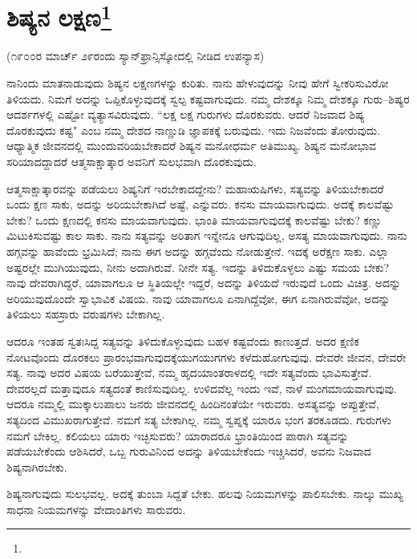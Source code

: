 
\chapter[ಶಿಷ್ಯನ ಲಕ್ಷಣ]{ಶಿಷ್ಯನ ಲಕ್ಷಣ\protect\footnote{}}

\begin{center}
(೧೯೦೦ರ ಮಾರ್ಚ್ ೨೯ರಂದು ಸ್ಯಾನ್‌ಫ್ರಾನ್ಸಿಸ್ಕೋದಲ್ಲಿ ನೀಡಿದ ಉಪನ್ಯಾಸ)
\end{center}

ನಾನಿಂದು ಮಾತನಾಡುವುದು ಶಿಷ್ಯನ ಲಕ್ಷಣಗಳನ್ನು ಕುರಿತು. ನಾನು ಹೇಳುವುದನ್ನು ನೀವು ಹೇಗೆ ಸ್ವೀಕರಿಸುವಿರೋ ತಿಳಿಯದು. ನಿಮಗೆ ಅದನ್ನು ಒಪ್ಪಿಕೊಳ್ಳುವುದಕ್ಕೆ ಸ್ವಲ್ಪ ಕಷ್ಟವಾಗುವುದು. ನಮ್ಮ ದೇಶಕ್ಕೂ ನಿಮ್ಮ ದೇಶಕ್ಕೂ ಗುರು–ಶಿಷ್ಯರ ಆದರ್ಶಗಳಲ್ಲಿ ಎಷ್ಟೋ ವ್ಯತ್ಯಾಸವಿರುವುದು. “ಲಕ್ಷ ಲಕ್ಷ ಗುರುಗಳು ದೊರಕುವರು. ಆದರೆ ನಿಜವಾದ ಶಿಷ್ಯ ದೊರಕುವುದು ಕಷ್ಟ" ಎಂಬ ನಮ್ಮ ದೇಶದ ನಾಣ್ಣುಡಿ ಜ್ಞಾಪಕಕ್ಕೆ ಬರುವುದು. ಇದು ನಿಜವೆಂದು ತೋರುವುದು. ಆಧ್ಯಾತ್ಮಿಕ ಜೀವನದಲ್ಲಿ ಮುಂದುವರಿಯಬೇಕಾದರೆ ಶಿಷ್ಯನ ಮನೋಧರ್ಮ ಅತಿಮುಖ್ಯ. ಶಿಷ್ಯನ ಮನೋಭಾವ ಸರಿಯಾದದ್ದಾದರೆ ಆತ್ಮಸಾಕ್ಷಾತ್ಕಾರ ಅವನಿಗೆ ಸುಲಭವಾಗಿ ದೊರಕುವುದು.

ಆತ್ಮಸಾಕ್ಷಾತ್ಕಾರವನ್ನು ಪಡೆಯಲು ಶಿಷ್ಯನಿಗೆ ಇರಬೇಕಾದದ್ದೇನು? ಮಹಾಋಷಿಗಳು, ಸತ್ಯವನ್ನು ತಿಳಿಯಬೇಕಾದರೆ ಒಂದು ಕ್ಷಣ ಸಾಕು, ಅದನ್ನು ಅರಿಯಬೇಕಾಗಿದೆ ಅಷ್ಟೆ, ಎನ್ನುವರು. ಕನಸು ಮಾಯವಾಗುವುದು. ಅದಕ್ಕೆ ಕಾಲವೆಷ್ಟು ಬೇಕು? ಒಂದು ಕ್ಷಣದಲ್ಲಿ ಕನಸು ಮಾಯವಾಗುವುದು. ಭಾಂತಿ ಮಾಯವಾಗುವುದಕ್ಕೆ ಕಾಲವೆಷ್ಟು ಬೇಕು? ಕಣ್ಣು ಮಿಟುಕಿಸುವಷ್ಟು ಕಾಲ ಸಾಕು. ನಾನು ಸತ್ಯವನ್ನು ಅರಿತಾಗ ಇನ್ನೇನೂ ಆಗುವುದಿಲ್ಲ, ಅಸತ್ಯ ಮಾಯವಾಗುವುದು. ನಾನು ಹಗ್ಗವನ್ನು ಹಾವೆಂದು ಭ್ರಮಿಸಿದೆ; ನಾನು ಈಗ ಅದನ್ನು ಹಗ್ಗವೆಂದು ನೋಡುತ್ತೇನೆ. ಇದಕ್ಕೆ ಅರೆಕ್ಷಣ ಸಾಕು. ಎಲ್ಲಾ ಅಷ್ಟರಲ್ಲೇ ಮುಗಿಯುವುದು, ನೀನು ಅದಾಗಿರುವೆ. ನೀನೇ ಸತ್ಯ. ಇದನ್ನು ತಿಳಿದುಕೊಳ್ಳಲು ಎಷ್ಟು ಸಮಯ ಬೇಕು? ನಾವು ದೇವರಾಗಿದ್ದರೆ, ಯಾವಾಗಲೂ ಆ ಸ್ಥಿತಿಯಲ್ಲೇ ಇದ್ದರೆ, ಅದನ್ನು ತಿಳಿಯದೆ ಇರುವುದೆ ಒಂದು ವಿಚಿತ್ರ. ಅದನ್ನು ಅರಿಯುವುದೊಂದೇ ಸ್ವಾಭಾವಿಕ ವಿಷಯ. ನಾವು ಯಾವಾಗಲೂ ಏನಾಗಿದ್ದೆವೋ, ಈಗ ಏನಾಗಿರುವೆವೋ, ಅದನ್ನು ತಿಳಿಯಲು ಸಹಸ್ರಾರು ವರುಷಗಳು ಬೇಕಾಗಿಲ್ಲ.

ಆದರೂ ಇಂತಹ ಸ್ವತಃಸಿದ್ದ ಸತ್ಯವನ್ನು ತಿಳಿದುಕೊಳ್ಳುವುದು ಬಹಳ ಕಷ್ಟವೆಂದು ಕಾಣುತ್ತದೆ. ಅದರ ಕ್ಷಣಿಕ ನೋಟವೊಂದು ದೊರಕಲು ಪ್ರಾರಂಭವಾಗುವುದಕ್ಕೆ\break ಯುಗಯುಗಗಳು ಕಳೆದುಹೋಗುವುವು. ದೇವರೇ ಜೀವನ, ದೇವರೇ ಸತ್ಯ. ನಾವು ಅದರ ವಿಷಯ ಬರೆಯುತ್ತೇವೆ, ನಮ್ಮ ಹೃದಯಾಂತರಾಳದಲ್ಲಿ ಇದೇ ಸತ್ಯವೆಂದು ಭಾವಿಸುತ್ತೇವೆ. ದೇವರಲ್ಲದೆ ಮತ್ತಾವುದೂ ಸತ್ಯದಂತೆ ಕಾಣಿಸುವುದಿಲ್ಲ. ಉಳಿದವೆಲ್ಲ ಇಂದು ಇವೆ, ನಾಳೆ ಮಂಗಮಾಯವಾಗುವುವು. ಆದರೂ ನಮ್ಮಲ್ಲಿ ಮುಕ್ಕಾಲುಪಾಲು ಜನರು ಜೀವನದಲ್ಲಿ ಹಿಂದಿನಂತೆಯೇ ಇರುವರು. ಅಸತ್ಯವನ್ನು ಅಪ್ಪುತ್ತೇವೆ, ಸತ್ಯದಿಂದ ವಿಮುಖರಾಗುತ್ತೇವೆ. ನಮಗೆ ಸತ್ಯ ಬೇಕಾಗಿಲ್ಲ. ನಮ್ಮ ಸ್ವಪ್ನಕ್ಕೆ ಯಾರೂ ಭಂಗ ತರಕೂಡದು. ಗುರುಗಳು ನಮಗೆ ಬೇಕಿಲ್ಲ. ಕಲಿಯಲು ಯಾರು ಇಚ್ಛಿಸುವರು? ಯಾರಾದರೂ ಭ್ರಾಂತಿಯಿಂದ ಪಾರಾಗಿ ಸತ್ಯವನ್ನು ಪಡೆಯಬೇಕೆಂದು ಆಶಿಸಿದರೆ, ಒಬ್ಬ ಗುರುವಿನಿಂದ ಅದನ್ನು ತಿಳಿಯಬೇಕೆಂದು ಇಚ್ಚಿಸಿದರೆ, ಅವನು ನಿಜವಾದ ಶಿಷ್ಯನಾಗಿರಬೇಕು.

ಶಿಷ್ಯನಾಗುವುದು ಸುಲಭವಲ್ಲ. ಅದಕ್ಕೆ ತುಂಬಾ ಸಿದ್ದತೆ ಬೇಕು. ಹಲವು ನಿಯಮಗಳನ್ನು ಪಾಲಿಸಬೇಕು. ನಾಲ್ಕು ಮುಖ್ಯ ಸಾಧನಾ ನಿಯಮಗಳನ್ನು ವೇದಾಂತಿಗಳು ಸಾರುವರು.

